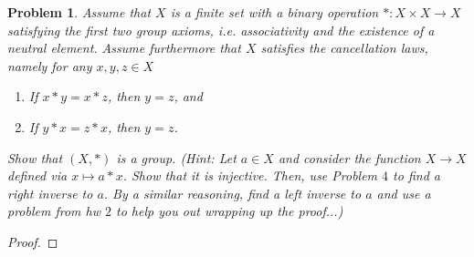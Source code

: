 \documentclass[reqno]{amsart}
\theoremstyle{plain}
\newtheorem{problem}{Problem}
\theoremstyle{definition}
\begin{document}
\begin{problem}
Assume that $X$ is a finite set with a binary operation $*:X \times X \longrightarrow X$ satisfying the first two group axioms, i.e. associativity and the existence of a neutral element.  Assume furthermore that $X$ satisfies the cancellation laws, namely for any $x,y,z \in X$
\begin{enumerate}
\item If $x * y = x * z$, then $y = z$, and
\item If $y * x = z * x$, then $y = z$.
\end{enumerate}
Show that $(X,*)$ is a group. (Hint:  Let $a \in X$ and consider the function $X \longrightarrow X$ defined via $x \mapsto a * x$.  Show that it is injective.  Then, use Problem $4$ to find a right inverse to $a$.  By a similar reasoning, find a left inverse to $a$ and use a problem from hw $2$ to help you out wrapping up the proof...)
\end{problem}
\begin{proof}

\end{proof}
\end{document}
